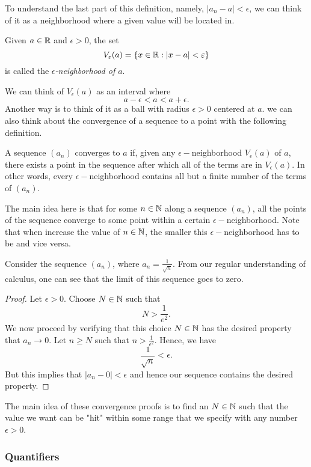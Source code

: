 To understand the last part of this definition, namely, \( |a_n - a| < \epsilon \), we can think of it as a neighborhood where a given value will be located in. 
\begin{definition} 
Given \( a \in \mathbb{R} \) and \( \epsilon  > 0 \), the set 
\[ V_{  \varepsilon }(a) = \{ x \in \mathbb{R} : |x-a| < \varepsilon  \}\]
is called the \textit{\( \epsilon \)-neighborhood of \( a \)}. 
\end{definition}
We can think of \( V_{ \epsilon }(a)\) as an interval where 
\[ a - \epsilon < a < a + \epsilon.\]
Another way is to think of it as a ball with radius \( \epsilon > 0\) centered at \( a \). 
we can also think about the convergence of a sequence to a point with the following definition.
\begin{definition}
    A sequence \( (a_n) \) converges to \( a \) if, given any \( \epsilon-\)neighborhood \( V_{ \epsilon } (a)\) of \( a \), there exists a point in the sequence after which all of the terms are in \( V_{ \epsilon } (a) \). In other words, every \( \epsilon - \)neighborhood contains all but a finite number of the terms of \( (a_n) \). 
\end{definition}

The main idea here is that for some \( n \in \mathbb{N} \) along a sequence \( (a_n) \), all the points of the sequence converge to some point within a certain \( \epsilon -\)neighborhood. Note that when increase the value of \( n \in \mathbb{N} \), the smaller this \( \epsilon-\)neighborhood has to be and vice versa.

Consider the sequence \( (a_n) \), where \( a_n = \frac{1}{ \sqrt{n} }\). From our regular understanding of calculus, one can see that the limit of this sequence goes to zero. 

%
\begin{proof}
Let \( \epsilon  > 0 \). Choose \( N \in \mathbb{N} \) such that 
\[ N > \frac{1}{e^2}.\]
We now proceed by verifying that this choice \( N \in \mathbb{N} \) has the desired property that \( a_n \to 0 \). Let \( n \geq N \) such that \( n > \frac{1}{ \epsilon^2} \). Hence, we have 
\[ \frac{1}{ \sqrt{n}} < \epsilon. \]
But this implies that \( |a_n - 0| < \epsilon \) and hence our sequence contains the desired property. 
\end{proof}
The main idea of these convergence proofs is to find an \( N \in \mathbb{N} \) such that the value we want can be "hit" within some range that we specify with any number \( \epsilon > 0   \).


\subsubsection{Quantifiers}

